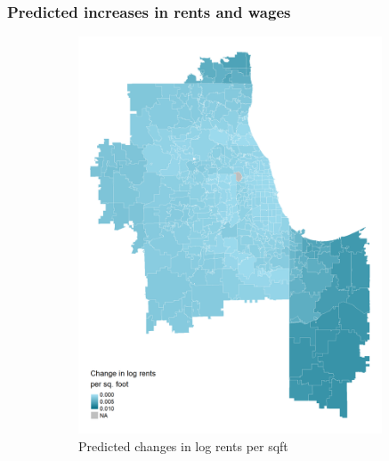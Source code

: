 \documentclass[aspectratio=169, t]{beamer}
\begin{document}
\begin{frame}
    \frametitle{Predicted increases in rents and wages}
    \begin{figure}
        \begin{subfigure}{0.51\textwidth}
            \includegraphics[width = 0.99\textwidth]{counterfactuals/output/chicago_d_ln_rents.png}
            \caption*{Predicted changes in log rents per sqft}
        \end{subfigure}%
        \begin{subfigure}{0.51\textwidth}

\end{subfigure}
\end{figure}
\end{frame}
\end{document}
